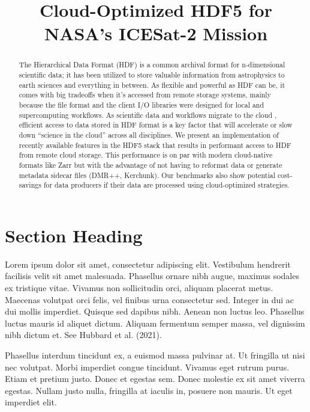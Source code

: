 \documentclass[
]{agujournal2019}
\begin{document}
\title{Cloud-Optimized HDF5 for NASA's ICESat-2 Mission}




\begin{abstract}
The Hierarchical Data Format (HDF) is a common archival format for
n-dimensional scientific data; it has been utilized to store valuable
information from astrophysics to earth sciences and everything in
between. As flexible and powerful as HDF can be, it comes with big
tradeoffs when it's accessed from remote storage systems, mainly because
the file format and the client I/O libraries were designed for local and
supercomputing workflows. As scientific data and workflows migrate to
the cloud , efficient access to data stored in HDF format is a key
factor that will accelerate or slow down ``science in the cloud'' across
all disciplines. We present an implementation of recently available
features in the HDF5 stack that results in performant access to HDF from
remote cloud storage. This performance is on par with modern
cloud-native formats like Zarr but with the advantage of not having to
reformat data or generate metadata sidecar files (DMR++, Kerchunk). Our
benchmarks also show potential cost-savings for data producers if their
data are processed using cloud-optimized strategies.
\end{abstract}





\section{Section Heading}\label{section-heading}

Lorem ipsum dolor sit amet, consectetur adipiscing elit. Vestibulum
hendrerit facilisis velit sit amet malesuada. Phasellus ornare nibh
augue, maximus sodales ex tristique vitae. Vivamus non sollicitudin
orci, aliquam placerat metus. Maecenas volutpat orci felis, vel finibus
urna consectetur sed. Integer in dui ac dui mollis imperdiet. Quisque
sed dapibus nibh. Aenean non luctus leo. Phasellus luctus mauris id
aliquet dictum. Aliquam fermentum semper massa, vel dignissim nibh
dictum et. See Hubbard et al. (2021).

Phasellus interdum tincidunt ex, a euismod massa pulvinar at. Ut
fringilla ut nisi nec volutpat. Morbi imperdiet congue tincidunt.
Vivamus eget rutrum purus. Etiam et pretium justo. Donec et egestas sem.
Donec molestie ex sit amet viverra egestas. Nullam justo nulla,
fringilla at iaculis in, posuere non mauris. Ut eget imperdiet elit.
\end{document}
